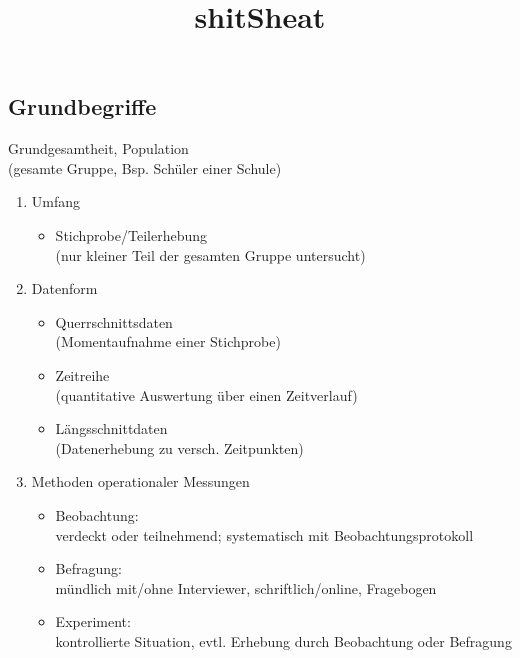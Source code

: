 \documentclass[10pt,a4paper,landscape]{article}
\title{shitSheat}
\newcommand{\setdocumentfont}{\fontsize{6}{8}\selectfont}
\begin{document}
\setdocumentfont
\begin{multicols}{4}
\noindent

\subsection{Grundbegriffe}
Grundgesamtheit, Population\\
	(gesamte Gruppe, Bsp. Schüler einer Schule)

\begin{enumerate}

\item Umfang
\begin{itemize}
\item Stichprobe/Teilerhebung\\
	(nur kleiner Teil der gesamten Gruppe untersucht)
\end{itemize}

\item Datenform

\begin{itemize}
\item Querrschnittsdaten\\
	(Momentaufnahme einer Stichprobe)
\item Zeitreihe\\
	(quantitative Auswertung über einen Zeitverlauf)
\item Längsschnittdaten\\
	(Datenerhebung zu versch. Zeitpunkten)
\end{itemize}

\item Methoden operationaler Messungen

\begin{itemize}
\item Beobachtung:\\
verdeckt oder teilnehmend; systematisch mit Beobachtungsprotokoll
\item Befragung: \\
mündlich mit/ohne Interviewer, schriftlich/online, Fragebogen
\item Experiment: \\
kontrollierte Situation, evtl. Erhebung durch Beobachtung oder Befragung
\end{itemize}

\end{enumerate}



\end{multicols}
\end{document}
